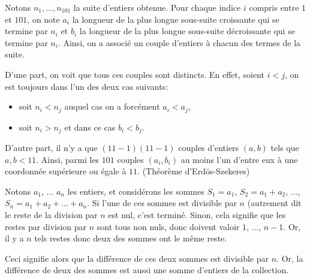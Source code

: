 \begin{Soln}{19}
Notons $n_1, \ldots, n_101$ la suite d'entiers obtenue. Pour chaque indice $i$ compris entre $1$ et $101$, on note $a_i$ la longueur de la plus longue sous-suite croissante qui se termine par $n_i$ et $b_i$ la longueur de la plus longue sous-suite d\'ecroissante qui se termine par $n_i$. Ainsi, on a associ\'e un couple d'entiers \`a chacun des termes de la suite.\newline

D'une part, on voit que tous ces couples sont distincts. En effet, soient $i<j$, on est toujours dans l'un des deux cas suivants:
\begin{itemize}
\item soit $n_i<n_j$ auquel cas on a forc\'ement $a_i<a_j$,
\item soit $n_i>n_j$ et dans ce cas $b_i<b_j$.
\end{itemize}

D'autre part, il n'y a que $\left(11-1\right)\left(11-1\right)$ couples d'entiers $\left(a,b\right)$ tels que $a,b<11$. Ainsi, parmi les $101$ couples $\left(a_i,b_i\right)$ au moins l'un d'entre eux \`a une coordonn\'ee sup\'erieure ou \'egale \`a $11$. (Th\'eor\`eme d'Erd\"os-Szekeres)
\end{Soln}
\begin{Soln}{20}
Notons $a_1$, ... $a_n$ les entiers, et considérons les sommes $S_1 = a_1$, $S_2 = a_1+a_2$, ..., $S_n = a_1+a_2+...+a_n$. Si l'une de ces sommes est divisible par $n$ (autrement dit le reste de la division par $n$ est nul, c'est terminé. Sinon, cela signifie que les restes par division par $n$ sont tous non nuls, donc doivent valoir $1$, ..., $n-1$. Or, il y a $n$ tels restes donc deux des sommes ont le même reste.

Ceci signifie alors que la différence de ces deux sommes est divisible par $n$. Or, la différence de deux des sommes est aussi une somme d'entiers de la collection.
\end{Soln}
